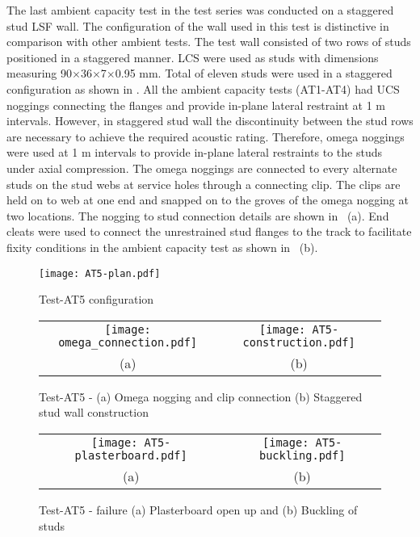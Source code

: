 The last ambient capacity test in the test series was conducted on a staggered stud LSF wall. The configuration of the wall used in this test is distinctive in comparison with other ambient tests. The test wall consisted of two rows of studs positioned in a staggered manner. LCS were used as studs with dimensions measuring 90\(\times\)36\(\times\)7\(\times\)0.95 mm. Total of eleven studs were used in a staggered configuration as shown in . All the ambient capacity tests (AT1-AT4) had UCS noggings connecting the flanges and provide in-plane lateral restraint at 1 m intervals. However, in staggered stud wall the discontinuity between the stud rows are necessary to achieve the required acoustic rating. Therefore, omega noggings were used at 1 m intervals to provide in-plane lateral restraints to the studs under axial compression. The omega noggings are connected to every alternate studs on the stud webs at service holes through a connecting clip. The clips are held on to web at one end and snapped on to the groves of the omega nogging at two locations. The nogging to stud connection details are shown in ~(a). End cleats were used to connect the unrestrained stud flanges to the track to facilitate fixity conditions in the ambient capacity test as shown in ~(b). 
\begin{figure}[!htbp]
	\centering
			\texttt{[image: AT5-plan.pdf]}\\
		\caption{Test-AT5 configuration}
		\label{fig:AT5-plan}
\end{figure}
\begin{figure}[!htbp]
	\centering
		\begin{tabular}{cc}
			\texttt{[image: omega\_connection.pdf]} & \texttt{[image: AT5-construction.pdf]} \\ 
			(a) & (b)  \\ 
		\end{tabular} 
		\caption{Test-AT5 - (a) Omega nogging and clip connection (b) Staggered stud wall construction}
		\label{fig:AT5-construction}
\end{figure}
\begin{figure}[!htbp]
	\centering
		\begin{tabular}{cc}
			\texttt{[image: AT5-plasterboard.pdf]} & \texttt{[image: AT5-buckling.pdf]} \\ 
			(a) & (b)  \\ 
		\end{tabular} 
		\caption{Test-AT5 - failure (a) Plasterboard open up and (b) Buckling of studs}
		\label{fig:AT5-failure}
\end{figure}
